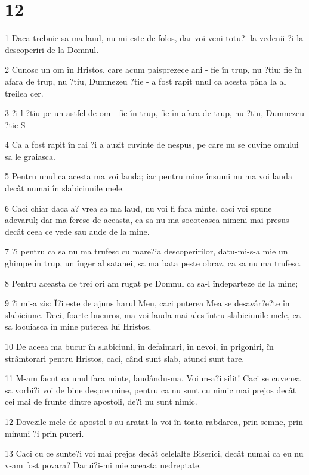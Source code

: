 \chapter{12}

\par 1 Daca trebuie sa ma laud, nu-mi este de folos, dar voi veni totu?i la vedenii ?i la descoperiri de la Domnul.
\par 2 Cunosc un om în Hristos, care acum paisprezece ani - fie în trup, nu ?tiu; fie în afara de trup, nu ?tiu, Dumnezeu ?tie - a fost rapit unul ca acesta pâna la al treilea cer.
\par 3 ?i-l ?tiu pe un astfel de om - fie în trup, fie în afara de trup, nu ?tiu, Dumnezeu ?tie S
\par 4 Ca a fost rapit în rai ?i a auzit cuvinte de nespus, pe care nu se cuvine omului sa le graiasca.
\par 5 Pentru unul ca acesta ma voi lauda; iar pentru mine însumi nu ma voi lauda decât numai în slabiciunile mele.
\par 6 Caci chiar daca a? vrea sa ma laud, nu voi fi fara minte, caci voi spune adevarul; dar ma feresc de aceasta, ca sa nu ma socoteasca nimeni mai presus decât ceea ce vede sau aude de la mine.
\par 7 ?i pentru ca sa nu ma trufesc cu mare?ia descoperirilor, datu-mi-s-a mie un ghimpe în trup, un înger al satanei, sa ma bata peste obraz, ca sa nu ma trufesc.
\par 8 Pentru aceasta de trei ori am rugat pe Domnul ca sa-l îndeparteze de la mine;
\par 9 ?i mi-a zis: Î?i este de ajuns harul Meu, caci puterea Mea se desavâr?e?te în slabiciune. Deci, foarte bucuros, ma voi lauda mai ales întru slabiciunile mele, ca sa locuiasca în mine puterea lui Hristos.
\par 10 De aceea ma bucur în slabiciuni, în defaimari, în nevoi, în prigoniri, în strâmtorari pentru Hristos, caci, când sunt slab, atunci sunt tare.
\par 11 M-am facut ca unul fara minte, laudându-ma. Voi m-a?i silit! Caci se cuvenea sa vorbi?i voi de bine despre mine, pentru ca nu sunt cu nimic mai prejos decât cei mai de frunte dintre apostoli, de?i nu sunt nimic.
\par 12 Dovezile mele de apostol s-au aratat la voi în toata rabdarea, prin semne, prin minuni ?i prin puteri.
\par 13 Caci cu ce sunte?i voi mai prejos decât celelalte Biserici, decât numai ca eu nu v-am fost povara? Darui?i-mi mie aceasta nedreptate.
